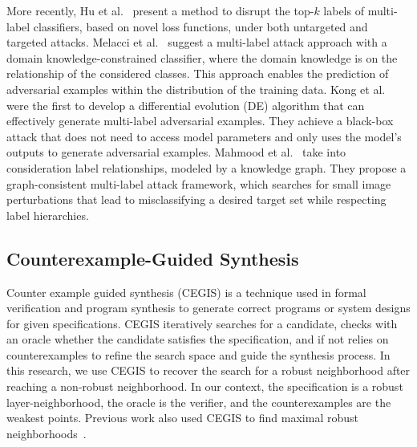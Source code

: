     More recently, Hu et al.~\cite{Hu_2021_ICCV} present a method to disrupt the top-$k$ labels of multi-label classifiers, based on novel loss functions, under both untargeted and targeted attacks.
    Melacci et al.~\cite{melacci:hal-02971233} suggest a multi-label attack approach with a domain knowledge-constrained classifier, where the domain knowledge is on the relationship of the considered classes.
    This approach enables the prediction of adversarial examples within the distribution of the training data.
    Kong et al.~\cite{9857594} were the first to develop a differential evolution (DE) algorithm that can effectively generate multi-label adversarial examples.
    They achieve a black-box attack that does not need to access model parameters and only uses the model's outputs to generate adversarial examples.
    Mahmood et al.~\cite{mahmood2022effective} take into consideration label relationships, modeled by a knowledge graph.
    They propose a graph-consistent multi-label attack framework, which searches for small image perturbations that lead to misclassifying a desired target set while respecting label hierarchies.

\subsection{Counterexample-Guided Synthesis}
Counter example guided synthesis (CEGIS) is a technique used in formal verification and program synthesis to generate correct programs or system designs for given specifications.
CEGIS iteratively searches for a candidate, checks with an oracle whether the candidate satisfies the specification, and if not relies on counterexamples to refine the search space and guide the synthesis process.
In this research, we use CEGIS to recover the search for a robust neighborhood after reaching a non-robust neighborhood. %
In our context, the specification is a robust layer-neighborhood, the oracle is the verifier, and the counterexamples are the weakest points.
Previous work also used CEGIS to find maximal robust neighborhoods~\cite{CEGIS1, MARVEL, CEGIS2, CEGIS3}. %